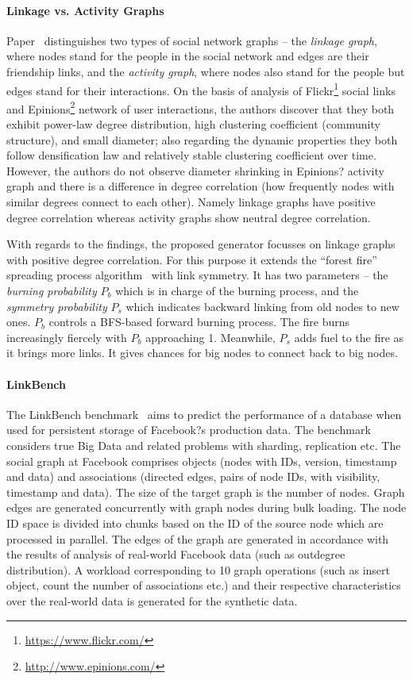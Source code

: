 \paragraph{Linkage vs. Activity Graphs} Paper~\cite{Yao2011} distinguishes two types of social network graphs -- the \emph{linkage graph}, where nodes stand for the people in the social network and edges are their friendship links, and the \emph{activity graph}, where nodes also stand for the people but edges stand for their interactions. On the basis of analysis of Flickr\footnote{\url{https://www.flickr.com/}} social links and Epinions\footnote{\url{http://www.epinions.com/}} network of user interactions, the authors discover that they both exhibit power-law degree distribution, high clustering coefficient (community structure), and small diameter; also regarding the dynamic properties they both follow densification law and relatively stable clustering coefficient over time. However, the authors do not observe diameter shrinking in Epinions? activity graph and there is a difference in degree correlation (how frequently nodes with similar degrees connect to each other). Namely linkage graphs have positive degree correlation whereas activity graphs show neutral degree correlation.

With regards to the findings, the proposed generator focusses on linkage graphs with positive degree correlation. For this purpose it extends the ``forest fire'' spreading process algorithm~\cite{Leskovec:2005:GOT:1081870.1081893} with link symmetry. It has two parameters -- the \emph{burning probability} $P_b$ which is in charge of the burning process, and the \emph{symmetry probability} $P_s$ which indicates backward linking from old nodes to new ones. $P_b$ controls a BFS-based forward burning process. The fire burns increasingly fiercely with $P_b$ approaching 1. Meanwhile, $P_s$ adds fuel to the fire as it brings more links. It gives chances for big nodes
to connect back to big nodes.


\paragraph{LinkBench} The LinkBench benchmark~\cite{Armstrong:2013:LDB:2463676.2465296} aims to predict the performance of a database when used for persistent storage of Facebook?s production data. The benchmark considers true Big Data and related problems with sharding, replication etc. The social graph at Facebook comprises objects (nodes with IDs, version, timestamp and data) and associations (directed edges, pairs of node IDs, with visibility, timestamp and data). The size of the target graph is the number of nodes. Graph edges are generated concurrently with graph nodes during bulk loading. The node ID space is divided into chunks based on the ID of the source node which  are processed in parallel. The edges of the graph are generated in accordance with the results of analysis of real-world Facebook data (such as outdegree distribution). A workload corresponding to 10 graph operations (such as insert object, count the number of associations etc.) and their respective characteristics over the real-world data is generated for the synthetic data.

